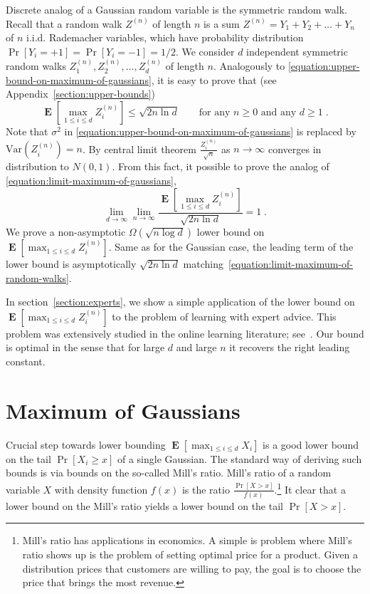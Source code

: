 \documentclass{article}
\DeclareMathOperator*{\Exp}{\mathbf{E}}
\newcommand{\Var}{\mathrm{Var}}
\begin{document}
Discrete analog of a Gaussian random variable is the symmetric random walk.
Recall that a random walk $Z^{(n)}$ of length $n$ is a sum $Z^{(n)} = Y_1 + Y_2
+ \dots + Y_n$ of $n$ i.i.d. Rademacher variables, which have probability
distribution $\Pr[Y_i = +1] = \Pr[Y_i = -1] = 1/2$. We consider $d$ independent
symmetric random walks $Z^{(n)}_1, Z^{(n)}_2, \dots, Z^{(n)}_d$ of length $n$.
Analogously to \eqref{equation:upper-bound-on-maximum-of-gaussians}, it is easy
to prove that (see Appendix~\ref{section:upper-bounds})
\begin{equation}
\label{equation:upper-bound-on-maximum-of-random-walks}
\Exp \left[ \max_{1 \le i \le d} Z^{(n)}_i \right] \le \sqrt{2 n \ln d} \qquad \text{for any $n \ge 0$ and any $d \ge 1$}\; .
\end{equation}
Note that $\sigma^2$ in \eqref{equation:upper-bound-on-maximum-of-gaussians} is
replaced by $\Var(Z^{(n)}_i) = n$. By central limit theorem
$\frac{Z^{(n)}_i}{\sqrt{n}}$ as $n \to \infty$ converges in distribution to
$N(0,1)$. From this fact, it possible to prove the analog of
\eqref{equation:limit-maximum-of-gaussians},
\begin{equation}
\label{equation:limit-maximum-of-random-walks}
\lim_{d \to \infty} \lim_{n \to \infty} \frac{\Exp\left[ \max_{1 \le i \le d} Z^{(n)}_i \right]}{\sqrt{2 n \ln d}} = 1 \; .
\end{equation}
We prove a non-asymptotic $\Omega(\sqrt{n \log d})$ lower bound on $\Exp\left[
\max_{1 \le i \le d} Z^{(n)}_i \right]$.  Same as for the Gaussian case, the
leading term of the lower bound is asymptotically $\sqrt{2 n \ln d}$
matching~\eqref{equation:limit-maximum-of-random-walks}.

In section~\ref{section:experts}, we show a simple application of the lower
bound on $\Exp\left[\max_{1 \le i \le d} Z^{(n)}_i \right]$ to the problem of
learning with expert advice.  This problem was extensively studied in the
online learning literature; see~\citep{Cesa-BianchiL06}.  Our bound is optimal
in the sense that for large $d$ and large $n$ it recovers the right leading
constant.

\section{Maximum of Gaussians}
\label{section:maximum-of-gaussians}

Crucial step towards lower bounding $\Exp \left[ \max_{1 \le i \le d} X_i
\right]$ is a good lower bound on the tail $\Pr[X_i \ge x]$ of a single
Gaussian. The standard way of deriving such bounds is via bounds on the so-called
Mill's ratio.  Mill's ratio of a random variable $X$ with density function
$f(x)$ is the ratio $\frac{\Pr[X > x]}{f(x)}$.\footnote{Mill's ratio has
applications in economics. A simple is problem where Mill's ratio shows up is
the problem of setting optimal price for a product.  Given a distribution
prices that customers are willing to pay, the goal is to choose the price that
brings the most revenue.} It clear that a lower bound on the Mill's ratio
yields a lower bound on the tail $\Pr[X > x]$.
\end{document}
